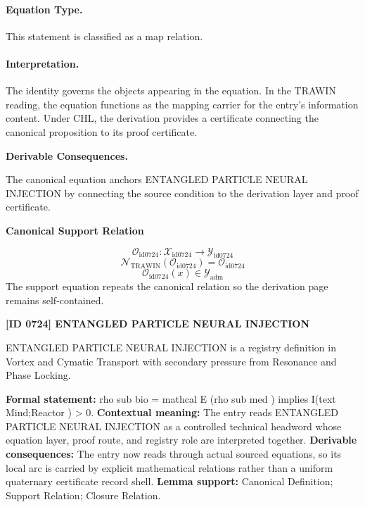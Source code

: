 \paragraph{Equation Type.}
This statement is classified as a map relation.

\paragraph{Interpretation.}
The identity governs the objects appearing in the equation. In the TRAWIN reading, the equation functions as the mapping carrier for the entry’s information content. Under CHL, the derivation provides a certificate connecting the canonical proposition to its proof certificate.

\par\vspace{0.35em}
\noindent\textbf{Derivable Consequences.}\quad
\begingroup
\footnotesize
\raggedright
The canonical equation anchors ENTANGLED PARTICLE NEURAL INJECTION by connecting the source condition to the derivation layer and proof certificate.
\par\endgroup

\noindent\textbf{Canonical Support Relation}\par
\[
\mathcal{O}_{\mathrm{id0724}}:\mathcal{X}_{\mathrm{id0724}}\longrightarrow\mathcal{Y}_{\mathrm{id0724}}
\]
\[
\mathcal{N}_{\mathrm{TRAWIN}}(\mathcal{O}_{\mathrm{id0724}})=\mathcal{O}_{\mathrm{id0724}}
\]
\[
\mathcal{O}_{\mathrm{id0724}}(x)\in\mathcal{Y}_{\mathrm{adm}}
\]
\noindent The support equation repeats the canonical relation so the derivation page remains self-contained.\par

\clearpage
\noindent\textbf{[ID 0724] ENTANGLED PARTICLE NEURAL INJECTION}\par
\vspace{0.35em}
\begingroup\small
{}
ENTANGLED PARTICLE NEURAL INJECTION is a registry definition in Vortex and Cymatic Transport with secondary pressure from Resonance and Phase Locking.

\begingroup\footnotesize\setlength{\emergencystretch}{3em}\sloppy
\textbf{Formal statement:} rho sub bio = mathcal E (rho sub med ) implies I(text Mind;Reactor ) > 0. \textbf{Contextual meaning:} The entry reads ENTANGLED PARTICLE NEURAL INJECTION as a controlled technical headword whose equation layer, proof route, and registry role are interpreted together. \textbf{Derivable consequences:} The entry now reads through actual sourced equations, so its local arc is carried by explicit mathematical relations rather than a uniform quaternary certificate record shell. \textbf{Lemma support:} Canonical Definition; Support Relation; Closure Relation.\par
\endgroup

